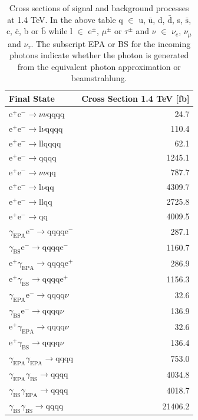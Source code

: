 \begin{table}[h!]
\centering
\begin{tabular}{ l r }
\hline
Final State & Cross Section 1.4 TeV [fb] \\ 
\hline
$\text{e}^{+}\text{e}^{-} \rightarrow \nu{\nu}\text{qqqq}$ & 24.7 \\
$\text{e}^{+}\text{e}^{-} \rightarrow \text{l}\nu\text{qqqq}$ & 110.4\\
$\text{e}^{+}\text{e}^{-} \rightarrow \text{llqqqq}$ & 62.1\\
$\text{e}^{+}\text{e}^{-} \rightarrow \text{qqqq}$ & 1245.1\\
$\text{e}^{+}\text{e}^{-} \rightarrow \nu{\nu}\text{qq}$ & 787.7\\
$\text{e}^{+}\text{e}^{-} \rightarrow \text{l}\nu\text{qq}$ & 4309.7\\
$\text{e}^{+}\text{e}^{-} \rightarrow \text{llqq}$ & 2725.8\\
$\text{e}^{+}\text{e}^{-} \rightarrow \text{qq}$ & 4009.5\\
$\gamma_{\text{EPA}}\text{e}^{-} \rightarrow \text{qqqq}\text{e}^{-}$ & 287.1\\
$\gamma_{\text{BS}}\text{e}^{-} \rightarrow \text{qqqq}\text{e}^{-}$ & 1160.7\\
$\text{e}^{+}\gamma_{\text{EPA}} \rightarrow \text{qqqq}\text{e}^{+}$ & 286.9\\
$\text{e}^{+}\gamma_{\text{BS}} \rightarrow \text{qqqq}\text{e}^{+}$ & 1156.3\\
$\gamma_{\text{EPA}}\text{e}^{-} \rightarrow \text{qqqq}\nu$ & 32.6\\
$\gamma_{\text{BS}}\text{e}^{-} \rightarrow \text{qqqq}\nu$ & 136.9\\
$\text{e}^{+}\gamma_{\text{EPA}} \rightarrow \text{qqqq}\nu$ & 32.6\\
$\text{e}^{+}\gamma_{\text{BS}} \rightarrow \text{qqqq}\nu$ & 136.4\\
$\gamma_{\text{EPA}}\gamma_{\text{EPA}} \rightarrow \text{qqqq}$ & 753.0\\
$\gamma_{\text{EPA}}\gamma_{\text{BS}} \rightarrow \text{qqqq}$ & 4034.8\\
$\gamma_{\text{BS}}\gamma_{\text{EPA}} \rightarrow \text{qqqq}$ & 4018.7\\
$\gamma_{\text{BS}}\gamma_{\text{BS}} \rightarrow \text{qqqq}$ & 21406.2\\
\hline
\end{tabular}
\caption[Cross sections of signal and background processes at 1.4 TeV]{Cross sections of signal and background processes at 1.4 TeV. In the above table q $\in$ u, $\bar{\text{u}}$, d, $\bar{\text{d}}$, s, $\bar{\text{s}}$, c, $\bar{\text{c}}$, b or $\bar{\text{b}}$ while l $\in$ $\text{e}^{\pm}$, $\mu^{\pm}$ or $\tau^{\pm}$ and $\nu$ $\in$ $\nu_{e}$, $\nu_{\mu}$ and $\nu_{\tau}$.  The subscript EPA or BS for the incoming photons indicate whether the photon is generated from the equivalent photon approximation or beamstrahlung.}
\label{table:crosssection1400GeV}
\end{table}

